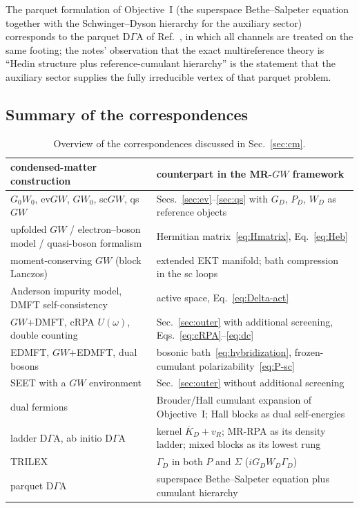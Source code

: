 \documentclass[11pt,a4paper]{article}
\newcommand{\GW}{$GW$}
\newcommand{\MRGW}{MR-$GW$}
\newcommand{\DGA}{D$\Gamma$A}
\begin{document}
The parquet formulation of Objective~I (the superspace Bethe--Salpeter
equation together with the Schwinger--Dyson hierarchy for the auxiliary
sector) corresponds to the parquet \DGA{} of Ref.~\cite{Rohringer2018}, in
which all channels are treated on the same footing; the notes' observation
that the exact multireference theory is ``Hedin structure plus
reference-cumulant hierarchy'' is the statement that the auxiliary sector
supplies the fully irreducible vertex of that parquet problem.

\subsection{Summary of the correspondences}

\begin{table}[h!]
\centering
\small
\begin{tabular}{>{\raggedright\arraybackslash}p{6.0cm}>{\raggedright\arraybackslash}p{8.8cm}}
\toprule
condensed-matter construction & counterpart in the \MRGW{} framework\\
\midrule
$G_0W_0$, ev\GW{}, $GW_0$, sc\GW{}, qs\GW{} & Secs.~\ref{sec:ev}--\ref{sec:qs} with $G_D$, $P_D$, $W_D$ as reference objects\\
upfolded \GW{} / electron--boson model / quasi-boson formalism & Hermitian matrix~\eqref{eq:Hmatrix}, Eq.~\eqref{eq:Heb}\\
moment-conserving \GW{} (block Lanczos) & extended EKT manifold; bath compression in the sc loops\\
Anderson impurity model, DMFT self-consistency & active space, Eq.~\eqref{eq:Delta-act}\\
\GW{}$+$DMFT, cRPA $U(\omega)$, double counting & Sec.~\ref{sec:outer} with additional screening, Eqs.~\eqref{eq:cRPA}--\eqref{eq:dc}\\
EDMFT, \GW{}$+$EDMFT, dual bosons & bosonic bath~\eqref{eq:hybridization}, frozen-cumulant polarizability~\eqref{eq:P-sc}\\
SEET with a \GW{} environment & Sec.~\ref{sec:outer} without additional screening\\
dual fermions & Brouder/Hall cumulant expansion of Objective~I; Hall blocks as dual self-energies\\
ladder \DGA{}, ab initio \DGA{} & kernel $\overline K_D+v_R$; MR-RPA as its density ladder; mixed blocks as its lowest rung\\
TRILEX & $\Gamma_D$ in both $P$ and $\Sigma$ ($iG_DW_D\Gamma_D$)\\
parquet \DGA{} & superspace Bethe--Salpeter equation plus cumulant hierarchy\\
\bottomrule
\end{tabular}
\caption{Overview of the correspondences discussed in Sec.~\ref{sec:cm}.}
\label{tab:summary}
\end{table}
\end{document}
